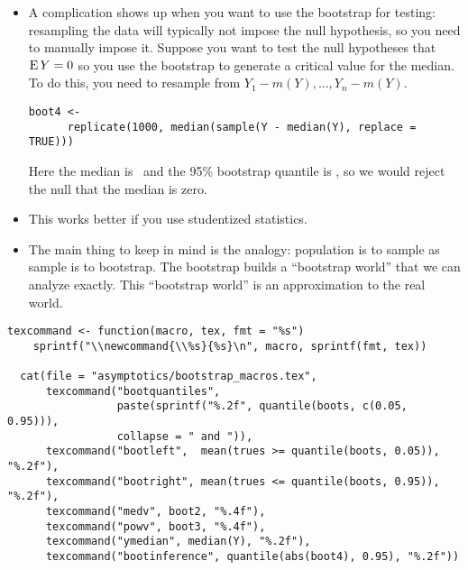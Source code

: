 \begin{itemize}[leftmargin=0pt]

\item A complication shows up when you want to use the bootstrap for
  testing: resampling the data will typically not impose the null
  hypothesis, so you need to manually impose it.  Suppose you want to
  test the null hypotheses that $\operatorname{E} Y = 0$ so you use the bootstrap to
  generate a critical value for the median.  To do this, you need to
  resample from $Y_1 - m(Y),...,Y_n - m(Y)$.
  \begin{lstlisting}[firstline=2,gobble=6]
    boot4 <-
      replicate(1000, median(sample(Y - median(Y), replace = TRUE)))
  \end{lstlisting}
  Here the median is \ymedian\ and the 95\% bootstrap quantile is
  \bootinference, so we would reject the null that the median is zero.

\item This works better if you use studentized statistics.
  
\item The main thing to keep in mind is the analogy: population is to
  sample as sample is to bootstrap.  The bootstrap builds a
  ``bootstrap world'' that we can analyze exactly.  This ``bootstrap
  world'' is an approximation to the real world.

\end{itemize}

\begin{lstlisting}[print=false]
  texcommand <- function(macro, tex, fmt = "%s")
    sprintf("\\newcommand{\\%s}{%s}\n", macro, sprintf(fmt, tex))

  cat(file = "asymptotics/bootstrap_macros.tex",
      texcommand("bootquantiles",
                 paste(sprintf("%.2f", quantile(boots, c(0.05, 0.95))),
                 collapse = " and ")),
      texcommand("bootleft",  mean(trues >= quantile(boots, 0.05)), "%.2f"),
      texcommand("bootright", mean(trues <= quantile(boots, 0.95)), "%.2f"),
      texcommand("medv", boot2, "%.4f"),
      texcommand("powv", boot3, "%.4f"),
      texcommand("ymedian", median(Y), "%.2f"),
      texcommand("bootinference", quantile(abs(boot4), 0.95), "%.2f"))
\end{lstlisting}

